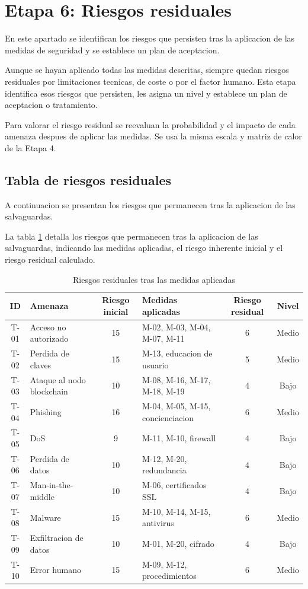 \documentclass[11pt, a4paper]{article}
\begin{document}
\section{Etapa 6: Riesgos residuales}

En este apartado se identifican los riesgos que persisten tras la aplicacion de las medidas de seguridad y se establece un plan de aceptacion.

Aunque se hayan aplicado todas las medidas descritas, siempre quedan riesgos residuales por limitaciones tecnicas, de coste o por el factor humano. Esta etapa identifica esos riesgos que persisten, les asigna un nivel y establece un plan de aceptacion o tratamiento.

Para valorar el riesgo residual se reevaluan la probabilidad y el impacto de cada amenaza despues de aplicar las medidas. Se usa la misma escala y matriz de calor de la Etapa 4.

\subsection{Tabla de riesgos residuales}

A continuacion se presentan los riesgos que permanecen tras la aplicacion de las salvaguardas.

La tabla \ref{tab:residual} detalla los riesgos que permanecen tras la aplicacion de las salvaguardas, indicando las medidas aplicadas, el riesgo inherente inicial y el riesgo residual calculado.

\begin{table}[H]
\centering
\renewcommand{\arraystretch}{1.4}
\small
\begin{tabular}{|c|p{2.8cm}|c|p{3.5cm}|c|c|}
\hline
\textbf{ID} & \textbf{Amenaza} & \textbf{Riesgo inicial} & \textbf{Medidas aplicadas} & \textbf{Riesgo residual} & \textbf{Nivel} \\
\hline
T-01 & Acceso no autorizado & 15 & M-02, M-03, M-04, M-07, M-11 & 6 & Medio \\
\hline
T-02 & Perdida de claves & 15 & M-13, educacion de usuario & 5 & Medio \\
\hline
T-03 & Ataque al nodo blockchain & 10 & M-08, M-16, M-17, M-18, M-19 & 4 & Bajo \\
\hline
T-04 & Phishing & 16 & M-04, M-05, M-15, concienciacion & 6 & Medio \\
\hline
T-05 & DoS & 9 & M-11, M-10, firewall & 4 & Bajo \\
\hline
T-06 & Perdida de datos & 10 & M-12, M-20, redundancia & 4 & Bajo \\
\hline
T-07 & Man-in-the-middle & 10 & M-06, certificados SSL & 4 & Bajo \\
\hline
T-08 & Malware & 15 & M-10, M-14, M-15, antivirus & 6 & Medio \\
\hline
T-09 & Exfiltracion de datos & 10 & M-01, M-20, cifrado & 4 & Bajo \\
\hline
T-10 & Error humano & 15 & M-09, M-12, procedimientos & 6 & Medio \\
\hline
\end{tabular}
\caption{Riesgos residuales tras las medidas aplicadas}
\label{tab:residual}
\end{table}
\end{document}
